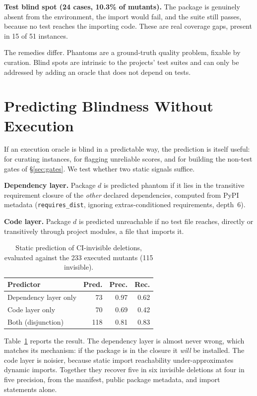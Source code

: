\documentclass[10pt,conference]{IEEEtran}
\newcommand{\code}[1]{\texttt{\small #1}}
\begin{document}
\textbf{Test blind spot (24 cases, 10.3\% of mutants).} The package is
genuinely absent from the environment, the import would fail, and the
suite still passes, because no test reaches the importing code. These are
real coverage gaps, present in 15 of 51 instances.

The remedies differ. Phantoms are a ground-truth quality problem, fixable
by curation. Blind spots are intrinsic to the projects' test suites and
can only be addressed by adding an oracle that does not depend on tests.

\section{Predicting Blindness Without Execution}
\label{sec:predictor}

If an execution oracle is blind in a predictable way, the prediction is
itself useful: for curating instances, for flagging unreliable scores,
and for building the non-test gates of \S\ref{sec:gates}. We test whether
two static signals suffice.

\textbf{Dependency layer.} Package $d$ is predicted phantom if it lies in
the transitive requirement closure of the \emph{other} declared
dependencies, computed from PyPI metadata (\code{requires\_dist},
ignoring extras-conditioned requirements, depth~6).

\textbf{Code layer.} Package $d$ is predicted unreachable if no test file
reaches, directly or transitively through project modules, a file that
imports it.

\begin{table}[t]
\caption{Static prediction of CI-invisible deletions, evaluated against
the 233 executed mutants (115 invisible).}
\label{tab:predictor}
\centering
\begin{tabular}{lrrr}
\toprule
\textbf{Predictor} & \textbf{Pred.} & \textbf{Prec.} & \textbf{Rec.} \\
\midrule
Dependency layer only  & 73  & 0.97 & 0.62 \\
Code layer only        & 70  & 0.69 & 0.42 \\
Both (disjunction)     & 118 & 0.81 & 0.83 \\
\bottomrule
\end{tabular}
\end{table}

Table~\ref{tab:predictor} reports the result. The dependency layer is
almost never wrong, which matches its mechanism: if the package is in the
closure it \emph{will} be installed. The code layer is noisier, because
static import reachability under-approximates dynamic imports. Together
they recover five in six invisible deletions at four in five precision,
from the manifest, public package metadata, and import statements alone.
\end{document}
